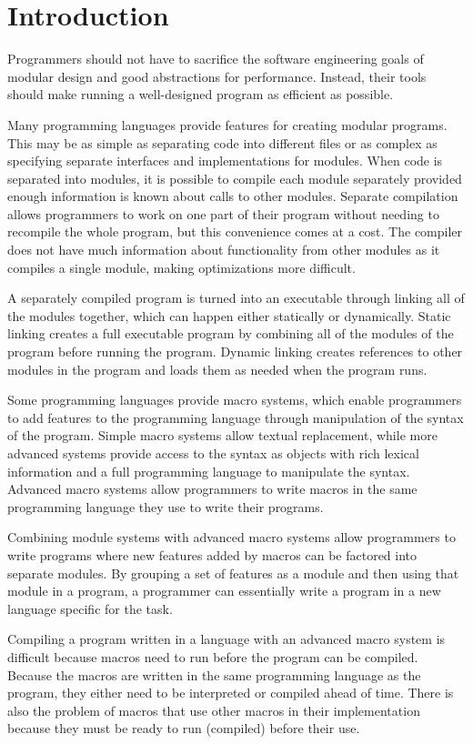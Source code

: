 \chapter{Introduction}
\label{chap:introduction}

Programmers should not have to sacrifice the software engineering goals of modular design and good abstractions for performance. 
Instead, their tools should make running a well-designed program as efficient as possible. 

Many programming languages provide features for creating modular programs. 
This may be as simple as separating code into different files or as complex as specifying separate interfaces and implementations for modules.
When code is separated into modules, it is possible to compile each module separately provided enough information is known about calls to other modules.
Separate compilation allows programmers to work on one part of their program without needing to recompile the whole program, but this convenience comes at a cost.
The compiler does not have much information about functionality from other modules as it compiles a single module, making optimizations more difficult.

A separately compiled program is turned into an executable through linking all of the modules together, which can happen either statically or dynamically.
Static linking creates a full executable program by combining all of the modules of the program before running the program.
Dynamic linking creates references to other modules in the program and loads them as needed when the program runs.

Some programming languages provide macro systems, which enable programmers to add features to the programming language through manipulation of the syntax of the program.
Simple macro systems allow textual replacement, while more advanced systems provide access to the syntax as objects with rich lexical information and a full programming language to manipulate the syntax.
Advanced macro systems allow programmers to write macros in the same programming language they use to write their programs. 

Combining module systems with advanced macro systems allow programmers to write programs where new features added by macros can be factored into separate modules.
By grouping a set of features as a module and then using that module in a program, a programmer can essentially write a program in a new language specific for the task.

Compiling a program written in a language with an advanced macro system is difficult because macros need to run before the program can be compiled.
Because the macros are written in the same programming language as the program, they either need to be interpreted or compiled ahead of time.
There is also the problem of macros that use other macros in their implementation because they must be ready to run (compiled) before their use.

